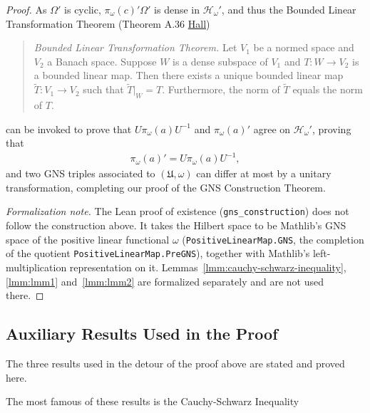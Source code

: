 \begin{proof}
As $\Omega'$ is cyclic, $\pi_\omega(c)'\Omega'$ is dense in $\mathcal{H}_\omega'$, and thus the  Bounded Linear Transformation Theorem (Theorem A.36 \href{https://doi.org/10.1007/978-1-4614-7116-5}{Hall})

\begin{quote}
    \textit{Bounded Linear Transformation Theorem.} Let $V_1$ be a normed space and $V_2$ a Banach space. Suppose $W$ is a dense subspace of $V_1$ and $T: W \rightarrow V_2$ is a bounded linear map. Then there exists a unique bounded linear map $\widetilde{T}: V_1 \rightarrow V_2$ such that $\widetilde{T}|_W = T$. Furthermore, the norm of $\widetilde{T}$ equals the norm of $T$.
\end{quote}

\noindent can be invoked to prove that $U\pi_\omega(a)U^{-1}$ and $\pi_\omega(a)'$ agree on $\mathcal{H}_\omega'$, proving that
\begin{align}
    \pi_\omega(a)' = U\pi_\omega(a)U^{-1},
\end{align}
and two GNS triples associated to $(\mathfrak{U}, \omega)$ can differ at most by a unitary transformation, completing our proof of the GNS Construction Theorem.

\noindent\textit{Formalization note.} The Lean proof of existence (\texttt{gns\_construction}) does not follow the construction above. It takes the Hilbert space to be Mathlib's GNS space of the positive linear functional $\omega$ (\texttt{PositiveLinearMap.GNS}, the completion of the quotient \texttt{PositiveLinearMap.PreGNS}), together with Mathlib's left-multiplication representation on it. Lemmas~\ref{lmm:cauchy-schwarz-inequality}, \ref{lmm:lmm1} and~\ref{lmm:lmm2} are formalized separately and are not used there.
\end{proof}

\subsection{Auxiliary Results Used in the Proof}
The three results used in the detour of the proof above are stated and proved here.

The most famous of these results is the Cauchy-Schwarz Inequality

